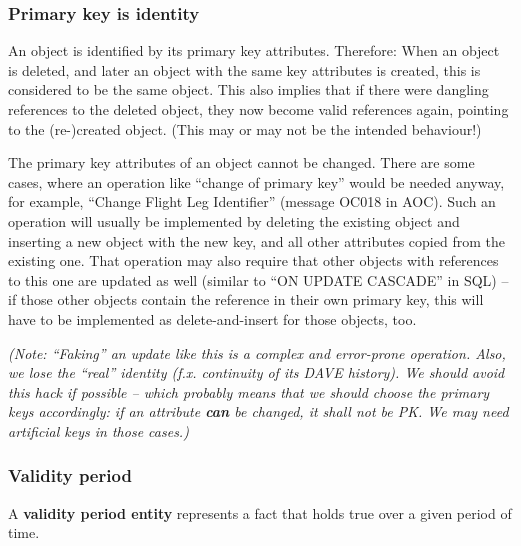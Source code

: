 \documentclass[techdoc]{nobs}   %
\begin{document}
\subsubsection{Primary key is identity}
\label{sec:Primary key is identity}

An object is identified by its primary key attributes.
Therefore: When an object is deleted,
and later an object with the same key attributes is created, this is considered to be
the same object. This also implies that if there were dangling references to the
deleted object, they now become valid references again, pointing to the (re-)created
object. (This may or may not be the intended behaviour!)

The primary key attributes of an object cannot be changed.
There are some cases, where an operation like ``change of primary key'' would be needed
anyway, for example, ``Change Flight Leg Identifier'' (message OC018 in AOC).
Such an operation
will usually be implemented by deleting the existing object and inserting a
new object with the new key, and all other attributes copied from the existing one.
That operation
may also require that other objects with references to this one are updated as well
(similar to ``ON UPDATE CASCADE'' in SQL) -- if those other objects contain the
reference in their own primary key, this will have to be implemented as delete-and-insert
for those objects, too.

{\it (Note: ``Faking'' an update like this is a complex and error-prone operation.
Also, we lose the ``real'' identity (f.x. continuity of its DAVE history).
We should avoid this hack if possible -- which probably means that we should choose
the primary keys accordingly: if an attribute {\bf can} be changed, it shall not be PK.
We may need artificial keys in those cases.)}



\subsubsection{Validity period}
\label{sec:Validity period}

A {\bf validity period entity} represents a fact that holds true over
a given period of time.
\end{document}
